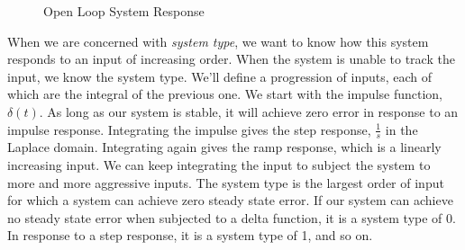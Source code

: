 \begin{figure}[ht]
    \centering



    \caption{Open Loop System Response}
    \label{fig:open loop sys blk diagram}
\end{figure}

When we are concerned with \textit{system type}, we want to know how this system responds to an input of increasing order. When the system is unable to track the input, we know the system type. We'll define a progression of inputs, each of which are the integral of the previous one. We start with the impulse function, $\delta(t)$. As long as our system is stable, it will achieve zero error in response to an impulse response. Integrating the impulse gives the step response, $\frac{1}{s}$ in the Laplace domain. Integrating again gives the ramp response, which is a linearly increasing input. We can keep integrating the input to subject the system to more and more aggressive inputs. The system type is the largest order of input for which a system can achieve zero steady state error. If our system can achieve no steady state error when subjected to a delta function, it is a system type of 0. In response to a step response, it is a system type of 1, and so on.

